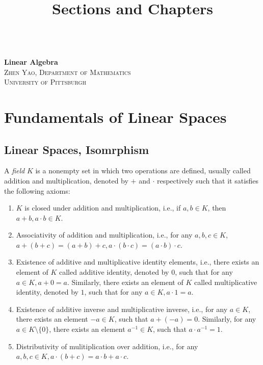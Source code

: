 \documentclass[11pt]{book}
\title{Sections and Chapters}
\theoremstyle{definition}
\numberwithin{equation}{subsection}
\begin{document}
\frontmatter

\begin{titlepage}
	\begin{center}
	\textbf{\LARGE{}} \\
	\vspace{40mm}
    \textbf{\LARGE{Linear Algebra}} \\
    \vspace{2mm} %
    \large{\textsc{Zhen Yao, Department of Mathematics}}\\
    \large{\textsc{University of Pittsburgh}}
    \end{center}
\end{titlepage}

\tableofcontents{}
\mainmatter

\newpage

\chapter{Fundamentals of Linear Spaces}
\section{Linear Spaces, Isomrphism}

A \emph{field} $K$ is a nonempty set in which two operations are defined, usually called addition and multiplication, denoted by $+$ and $\cdot$ respectively such that it satisfies the following axioms:
\begin{enumerate}[label=(\arabic*)]
    \item $K$ is closed under addition and multiplication, i.e., if $a,b\in K$, then $a+b, a\cdot b\in K$.
    \item Associativity of addition and multiplication, i.e., for any $a,b,c\in K$, $a+(b+c) = (a+b)+c, a\cdot(b\cdot c) = (a\cdot b)\cdot c$.
    \item Existence of additive and multiplicative identity elements, i.e., there exists an element of $K$ called additive identity, denoted by $0$, such that for any $a
    \in K, a+0=a$. Similarly, there exists an element of $K$ called multiplicative identity, denoted by $1$, such that for any $a\in K, a\cdot 1=a$.
    \item Existence of additive inverse and multiplicative inverse, i.e., for any $a\in K$, there exists an element $-a\in K$, such that $a+(-a)=0$. Similarly, for any $a\in K\setminus \{0\}$, there exists an element $a^{-1}\in K$, such that $a\cdot a^{-1}=1$.
    \item Distributivity of mulitiplication over addition, i.e., for any $a,b,c\in K, a\cdot(b+c)=a\cdot b+a\cdot c$.
\end{enumerate}
\end{document}
